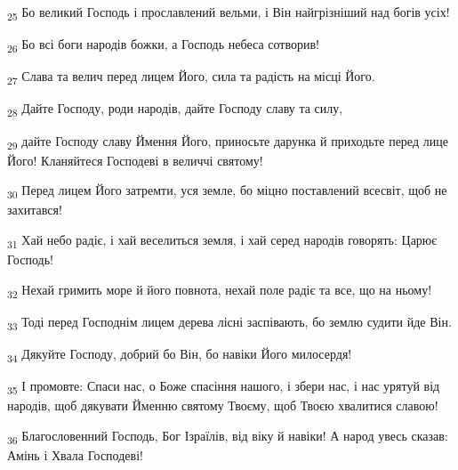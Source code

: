 \begin{tcolorbox}
\textsubscript{25} Бо великий Господь і прославлений вельми, і Він найгрізніший над богів усіх!
\end{tcolorbox}
\begin{tcolorbox}
\textsubscript{26} Бо всі боги народів божки, а Господь небеса сотворив!
\end{tcolorbox}
\begin{tcolorbox}
\textsubscript{27} Слава та велич перед лицем Його, сила та радість на місці Його.
\end{tcolorbox}
\begin{tcolorbox}
\textsubscript{28} Дайте Господу, роди народів, дайте Господу славу та силу,
\end{tcolorbox}
\begin{tcolorbox}
\textsubscript{29} дайте Господу славу Ймення Його, приносьте дарунка й приходьте перед лице Його! Кланяйтеся Господеві в величчі святому!
\end{tcolorbox}
\begin{tcolorbox}
\textsubscript{30} Перед лицем Його затремти, уся земле, бо міцно поставлений всесвіт, щоб не захитався!
\end{tcolorbox}
\begin{tcolorbox}
\textsubscript{31} Хай небо радіє, і хай веселиться земля, і хай серед народів говорять: Царює Господь!
\end{tcolorbox}
\begin{tcolorbox}
\textsubscript{32} Нехай гримить море й його повнота, нехай поле радіє та все, що на ньому!
\end{tcolorbox}
\begin{tcolorbox}
\textsubscript{33} Тоді перед Господнім лицем дерева лісні заспівають, бо землю судити йде Він.
\end{tcolorbox}
\begin{tcolorbox}
\textsubscript{34} Дякуйте Господу, добрий бо Він, бо навіки Його милосердя!
\end{tcolorbox}
\begin{tcolorbox}
\textsubscript{35} І промовте: Спаси нас, о Боже спасіння нашого, і збери нас, і нас урятуй від народів, щоб дякувати Йменню святому Твоєму, щоб Твоєю хвалитися славою!
\end{tcolorbox}
\begin{tcolorbox}
\textsubscript{36} Благословенний Господь, Бог Ізраїлів, від віку й навіки! А народ увесь сказав: Амінь і Хвала Господеві!
\end{tcolorbox}
